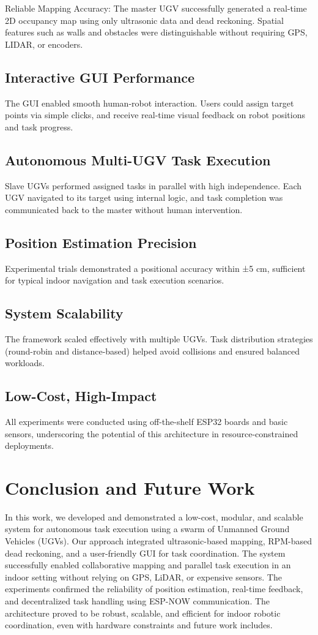 \documentclass[conference]{IEEEtran}
\begin{document}
Reliable Mapping Accuracy: The master UGV successfully generated a real-time 2D occupancy map using only ultrasonic data and dead reckoning. Spatial features such as walls and obstacles were distinguishable without requiring GPS, LIDAR, or encoders.

\subsection{Interactive GUI Performance} 
The GUI enabled smooth human-robot interaction. Users could assign target points via simple clicks, and receive 
real-time visual feedback on robot positions and task progress.

\subsection{Autonomous Multi-UGV Task Execution}
Slave UGVs performed assigned tasks in parallel with high independence. Each UGV navigated to its target using internal logic, and task completion was communicated back to the master without human intervention.

\subsection{Position Estimation Precision}
Experimental trials demonstrated a positional accuracy within ±5 cm, sufficient for typical indoor navigation and task execution scenarios.

\subsection{System Scalability}
The framework scaled effectively with multiple UGVs. Task distribution strategies (round-robin and distance-based) helped avoid collisions and ensured balanced workloads.

\subsection{Low-Cost, High-Impact}
All experiments were conducted using off-the-shelf ESP32 boards and basic sensors, underscoring the potential of this architecture in resource-constrained deployments.

\section{Conclusion and Future Work}
\label{sec:conclusion}
In this work, we developed and demonstrated a low-cost, modular, and scalable system for autonomous task execution using a swarm of Unmanned Ground Vehicles (UGVs). Our approach integrated ultrasonic-based mapping, RPM-based dead reckoning, and a user-friendly GUI for task coordination. The system successfully enabled collaborative mapping and parallel task execution in an indoor setting without relying on GPS, LiDAR, or expensive sensors.
The experiments confirmed the reliability of position estimation, real-time feedback, and decentralized task handling using ESP-NOW communication. The architecture proved to be robust, scalable, and efficient for indoor robotic coordination, even with hardware constraints and future work includes.
\end{document}
